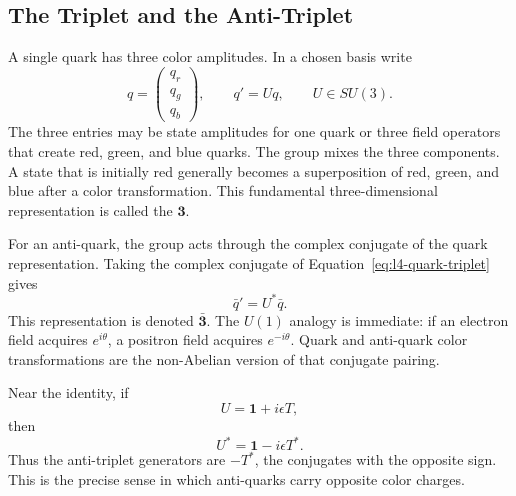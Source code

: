 \subsection{The Triplet and the Anti-Triplet}

A single quark has three color amplitudes. In a chosen basis write
\begin{equation}
q=
\begin{pmatrix}
q_r\\q_g\\q_b
\end{pmatrix},
\qquad
q'=Uq,
\qquad U\in SU(3).
\label{eq:l4-quark-triplet}
\end{equation}
The three entries may be state amplitudes for one quark or three field
operators that create red, green, and blue quarks. The group mixes the three
components. A state that is initially red generally becomes a superposition
of red, green, and blue after a color transformation. This fundamental
three-dimensional representation is called the \(\boldsymbol 3\).

For an anti-quark, the group acts through the complex conjugate of the quark
representation. Taking the complex conjugate of
Equation~\eqref{eq:l4-quark-triplet} gives
\begin{equation}
\bar q'=U^*\bar q.
\end{equation}
This representation is denoted \(\bar{\boldsymbol 3}\). The \(U(1)\) analogy is
immediate: if an electron field acquires \(e^{i\theta}\), a positron field
acquires \(e^{-i\theta}\). Quark and anti-quark color transformations are the
non-Abelian version of that conjugate pairing.

Near the identity, if
\begin{equation}
U=\boldsymbol 1+i\epsilon T,
\end{equation}
then
\begin{equation}
U^*=\boldsymbol 1-i\epsilon T^*.
\end{equation}
Thus the anti-triplet generators are \(-T^*\), the conjugates with the opposite
sign. This is the precise sense in which anti-quarks carry opposite color
charges.

\begin{classroomqa}
\end{classroomqa}

